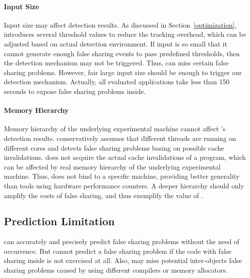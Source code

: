 \paragraph{Input Size} Input size may affect detection results.  As discussed in Section~\ref{optimization}, \Predator{} introduces several threshold values to reduce the tracking overhead, which can be adjusted based on actual detection environment. If input is so small that it cannot generate enough false sharing events to pass predefined thresholds,  then the detection mechanism may not be triggered. Thus, \Predator{} can miss certain false sharing problems. However, fair large input size should be enough to trigger our detection mechanism. Actually, all evaluated applications take less than 150 seconds to expose false sharing problems inside. 

\paragraph{Memory Hierarchy} Memory hierarchy of the underlying experimental machine cannot affect \Predator{}'s detection results. \Predator{} conservatively assumes that different threads are running on different cores and detects false sharing problems basing on possible cache invalidations. \Predator{} does not acquire the actual cache invalidations of a program, which can be affected by real memory hierarchy of the underlying experimental machine. Thus, \Predator{} does not bind to a specific machine, providing better generality than tools using hardware performance counters. A deeper hierarchy should only amplify the costs of false sharing, and thus exemplify the value of \Predator{}.

\subsection{Prediction Limitation} 
\Predator{} can accurately and precisely predict false sharing problems without the need of occurrence. But \Predator{} cannot  predict a false sharing problem if the code with false sharing inside is not exercised at all. Also, \Predator{} may miss potential inter-objects false sharing problems caused by using different compilers or memory allocators. 